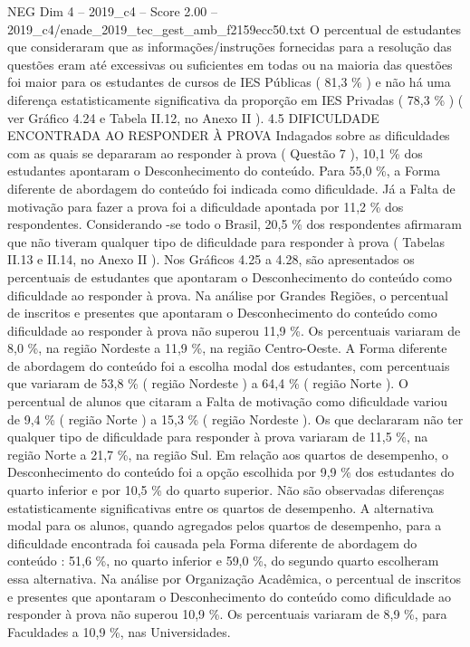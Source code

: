 \begin{textsample}{NEG Dim 4 – 2019\_c4 – Score 2.00 – 2019\_c4/enade\_2019\_tec\_gest\_amb\_f2159ecc50.txt}
O percentual de estudantes que consideraram que as informações/instruções fornecidas para a resolução das questões eram até excessivas ou suficientes em todas ou na maioria das questões foi maior para os estudantes de cursos de IES Públicas ( 81,3 \% ) e não há uma diferença estatisticamente significativa da proporção em IES Privadas ( 78,3 \% ) ( ver Gráfico 4.24 e Tabela II.12, no Anexo II ). 4.5 DIFICULDADE ENCONTRADA AO RESPONDER À PROVA Indagados sobre as dificuldades com as quais se depararam ao responder à prova ( Questão 7 ), 10,1 \% dos estudantes apontaram o Desconhecimento do conteúdo.
Para 55,0 \%, a Forma diferente de abordagem do conteúdo foi indicada como dificuldade.
Já a Falta de motivação para fazer a prova foi a dificuldade apontada por 11,2 \% dos respondentes.
Considerando -se todo o Brasil, 20,5 \% dos respondentes afirmaram que não tiveram qualquer tipo de dificuldade para responder à prova ( Tabelas II.13 e II.14, no Anexo II ).
Nos Gráficos 4.25 a 4.28, são apresentados os percentuais de estudantes que apontaram o Desconhecimento do conteúdo como dificuldade ao responder à prova.
Na análise por Grandes Regiões, o percentual de inscritos e presentes que apontaram o Desconhecimento do conteúdo como dificuldade ao responder à prova não superou 11,9 \%.
Os percentuais variaram de 8,0 \%, na região Nordeste a 11,9 \%, na região Centro-Oeste.
A Forma diferente de abordagem do conteúdo foi a escolha modal dos estudantes, com percentuais que variaram de 53,8 \% ( região Nordeste ) a 64,4 \% ( região Norte ).
O percentual de alunos que citaram a Falta de motivação como dificuldade variou de 9,4 \% ( região Norte ) a 15,3 \% ( região Nordeste ).
Os que declararam não ter qualquer tipo de dificuldade para responder à prova variaram de 11,5 \%, na região Norte a 21,7 \%, na região Sul.
Em relação aos quartos de desempenho, o Desconhecimento do conteúdo foi a opção escolhida por 9,9 \% dos estudantes do quarto inferior e por 10,5 \% do quarto superior.
Não são observadas diferenças estatisticamente significativas entre os quartos de desempenho.
A alternativa modal para os alunos, quando agregados pelos quartos de desempenho, para a dificuldade encontrada foi causada pela Forma diferente de abordagem do conteúdo : 51,6 \%, no quarto inferior e 59,0 \%, do segundo quarto escolheram essa alternativa.
Na análise por Organização Acadêmica, o percentual de inscritos e presentes que apontaram o Desconhecimento do conteúdo como dificuldade ao responder à prova não superou 10,9 \%.
Os percentuais variaram de 8,9 \%, para Faculdades a 10,9 \%, nas Universidades.

\end{textsample}
